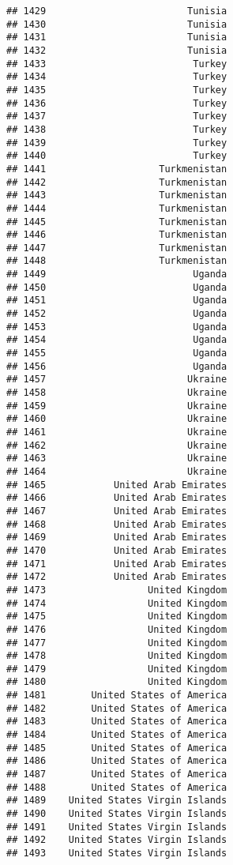 \documentclass[]{article}
\begin{document}
\begin{verbatim}
## 1429                         Tunisia
## 1430                         Tunisia
## 1431                         Tunisia
## 1432                         Tunisia
## 1433                          Turkey
## 1434                          Turkey
## 1435                          Turkey
## 1436                          Turkey
## 1437                          Turkey
## 1438                          Turkey
## 1439                          Turkey
## 1440                          Turkey
## 1441                    Turkmenistan
## 1442                    Turkmenistan
## 1443                    Turkmenistan
## 1444                    Turkmenistan
## 1445                    Turkmenistan
## 1446                    Turkmenistan
## 1447                    Turkmenistan
## 1448                    Turkmenistan
## 1449                          Uganda
## 1450                          Uganda
## 1451                          Uganda
## 1452                          Uganda
## 1453                          Uganda
## 1454                          Uganda
## 1455                          Uganda
## 1456                          Uganda
## 1457                         Ukraine
## 1458                         Ukraine
## 1459                         Ukraine
## 1460                         Ukraine
## 1461                         Ukraine
## 1462                         Ukraine
## 1463                         Ukraine
## 1464                         Ukraine
## 1465            United Arab Emirates
## 1466            United Arab Emirates
## 1467            United Arab Emirates
## 1468            United Arab Emirates
## 1469            United Arab Emirates
## 1470            United Arab Emirates
## 1471            United Arab Emirates
## 1472            United Arab Emirates
## 1473                  United Kingdom
## 1474                  United Kingdom
## 1475                  United Kingdom
## 1476                  United Kingdom
## 1477                  United Kingdom
## 1478                  United Kingdom
## 1479                  United Kingdom
## 1480                  United Kingdom
## 1481        United States of America
## 1482        United States of America
## 1483        United States of America
## 1484        United States of America
## 1485        United States of America
## 1486        United States of America
## 1487        United States of America
## 1488        United States of America
## 1489    United States Virgin Islands
## 1490    United States Virgin Islands
## 1491    United States Virgin Islands
## 1492    United States Virgin Islands
## 1493    United States Virgin Islands

\end{verbatim}
\end{document}
